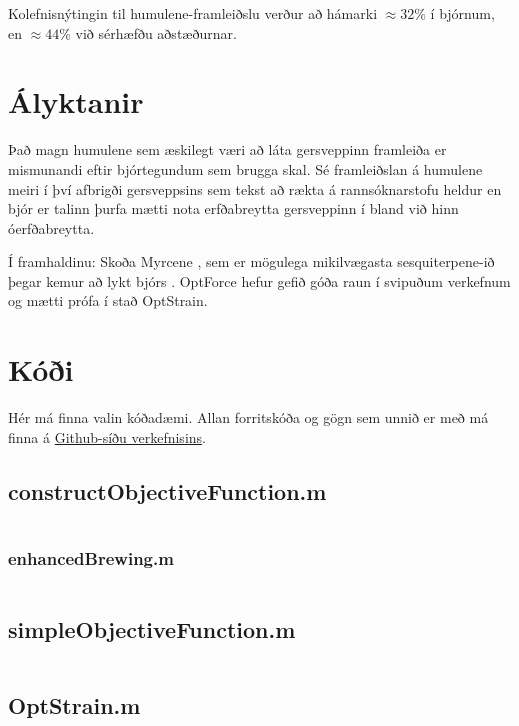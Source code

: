 \documentclass[11pt]{article}
\newcommand{\matlab}[1]{\inputminted[linenos, frame=lines, label=#1, fontsize=\small]{matlab}{#1}}
\begin{document}
\begin{multicols}{2}
Kolefnisnýtingin til humulene-framleiðslu verður að hámarki $\approx32\%$ í bjórnum, en $\approx44\%$ við sérhæfðu aðstæðurnar.

\section{Ályktanir}


Það magn humulene sem æskilegt væri að láta gersveppinn framleiða er mismunandi eftir bjórtegundum sem brugga skal. Sé framleiðslan á humulene meiri í því afbrigði gersveppsins sem tekst að rækta á rannsóknarstofu heldur en bjór er talinn þurfa mætti nota erfðabreytta gersveppinn í bland við hinn óerfðabreytta.

Í framhaldinu: Skoða Myrcene \cite[KEGG: C06074]{Kanehisa01012000}, sem er mögulega mikilvægasta sesquiterpene-ið þegar kemur að lykt bjórs \cite{guadagni1966odour}. OptForce\cite{ranganathan2010optforce} hefur gefið góða raun í svipuðum verkefnum og mætti prófa í stað OptStrain.




\end{multicols}


\clearpage
\appendix
\section{Kóði}
Hér má finna valin kóðadæmi. Allan forritskóða og gögn sem unnið er með má finna á \href{https://github.com/Ernir/optstrain}{Github-síðu verkefnisins}.

\subsection{constructObjectiveFunction.m}
\label{code:constructObjectiveFunction}
\matlab{../constructObjectiveFunction.m}

\subsubsection{enhancedBrewing.m}
\label{code:enhancedBrewing}
\matlab{../enhancedBrewing.m}

\subsection{simpleObjectiveFunction.m}
\label{code:simpleObjectiveFunction}
\matlab{../simpleObjectiveFunction.m}

\subsection{OptStrain.m}
\label{code:OptStrain}
\matlab{../OptStrain.m}
\end{document}
